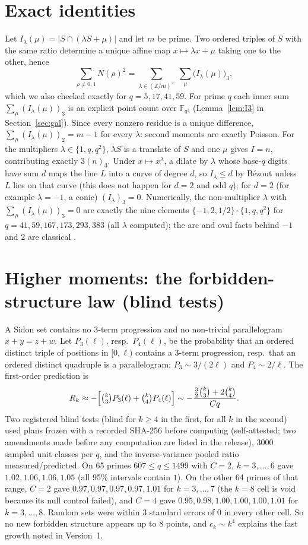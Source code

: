 \documentclass[11pt]{article}
\begin{document}
\section{Exact identities}
Let $I_\lambda(\mu)=|S\cap(\lambda S+\mu)|$ and let $m$ be prime. Two ordered triples of $S$ with the same ratio determine a unique affine map
$x\mapsto\lambda x+\mu$ taking one to the other, hence
\[\sum_{\rho\ne0,1}N(\rho)^2=\sum_{\lambda\in(\mathbb Z/m)^\times}\ \sum_{\mu}\bigl(I_\lambda(\mu)\bigr)_3,\]
which we also checked exactly for $q=5,17,41,59$. For prime $q$ each inner sum $\sum_\mu(I_\lambda(\mu))_3$ is an explicit point count over
$\mathbb F_{q^3}$ (Lemma~\ref{lem:I3} in Section~\ref{sec:gal}). Since every nonzero residue is a unique difference, $\sum_\mu(I_\lambda(\mu))_2=m-1$
for every $\lambda$: second moments are exactly Poisson. For the multipliers $\lambda\in\{1,q,q^2\}$, $\lambda S$ is a translate of
$S$ and one $\mu$ gives $I=n$, contributing exactly $3(n)_3$. Under $x\mapsto x^\lambda$, a dilate by $\lambda$ whose base-$q$ digits
have sum $d$ maps the line $L$ into a curve of degree $d$, so $I_\lambda\le d$ by B\'ezout unless $L$ lies on that curve (this does not happen for $d=2$ and odd $q$); for $d=2$ (for example $\lambda=-1$, a
conic) $(I_\lambda)_3=0$. Numerically, the non-multiplier $\lambda$ with $\sum_\mu(I_\lambda(\mu))_3=0$ are exactly the nine elements
$\{-1,2,1/2\}\cdot\{1,q,q^2\}$ for $q=41,59,167,173,293,383$ (all $\lambda$ computed); the arc and oval facts behind $-1$ and $2$ are classical
\cite{JV,Pi}.

\section{Higher moments: the forbidden-structure law (blind tests)}
A Sidon set contains no 3-term progression and no non-trivial parallelogram $x+y=z+w$. Let $P_3(\ell)$, resp.\ $P_4(\ell)$, be the
probability that an ordered distinct triple of positions in $[0,\ell)$ contains a 3-term progression, resp.\ that an ordered distinct
quadruple is a parallelogram; $P_3\sim3/(2\ell)$ and $P_4\sim2/\ell$. The first-order prediction is
\[R_k\approx-\Bigl[\tbinom k3P_3(\ell)+\tbinom k4P_4(\ell)\Bigr]\sim-\frac{\tfrac32\binom k3+2\binom k4}{Cq}.\]
Two registered blind tests (blind for $k\ge4$ in the first, for all $k$ in the second) used plans frozen with a recorded SHA-256 before computing (self-attested; two amendments made before any computation are listed in the release), 3000 sampled unit classes per $q$, and the
inverse-variance pooled ratio measured/predicted. On 65 primes $607\le q\le1499$ with $C=2$, $k=3,\dots,6$ gave $1.02,1.06,1.06,1.05$
(all 95\% intervals contain $1$). On the other 64 primes of that range, $C=2$ gave $0.97,0.97,0.97,0.97,1.01$ for $k=3,\dots,7$ (the
$k=8$ cell is void because its null control failed), and $C=4$ gave $0.95,0.98,1.00,1.00,1.00,1.01$ for $k=3,\dots,8$. Random sets were
within $3$ standard errors of $0$ in every other cell. So no new forbidden structure appears up to $8$ points, and $c_k\sim k^4$ explains the fast growth
noted in Version~1.
\end{document}
